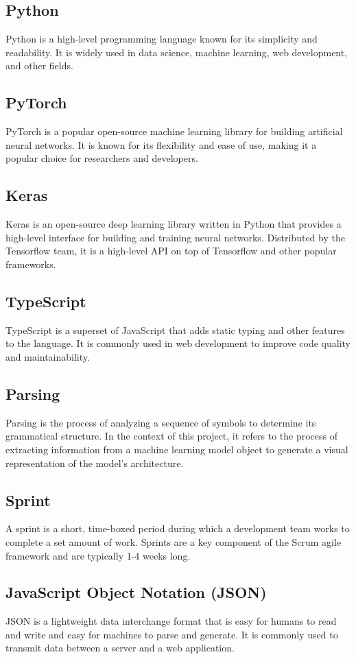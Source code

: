 \subsection*{Python}
Python is a high-level programming language known for its simplicity and readability. It is widely used in data science, machine learning, web development, and other fields.

\subsection*{PyTorch}
PyTorch is a popular open-source machine learning library for building artificial neural networks. It is known for its flexibility and ease of use, making it a popular choice for researchers and developers.

\subsection*{Keras}
Keras is an open-source deep learning library written in Python that provides a high-level interface for building and training neural networks. Distributed by the Tensorflow team, it is a high-level API on top of Tensorflow and other popular frameworks.

\subsection*{TypeScript}
TypeScript is a superset of JavaScript that adds static typing and other features to the language. It is commonly used in web development to improve code quality and maintainability.

\subsection*{Parsing}
Parsing is the process of analyzing a sequence of symbols to determine its grammatical structure. In the context of this project, it refers to the process of extracting information from a machine learning model object to generate a visual representation of the model's architecture.

\subsection*{Sprint}
A sprint is a short, time-boxed period during which a development team works to complete a set amount of work. Sprints are a key component of the Scrum agile framework and are typically 1-4 weeks long.

\subsection*{JavaScript Object Notation (JSON)}
JSON is a lightweight data interchange format that is easy for humans to read and write and easy for machines to parse and generate. It is commonly used to transmit data between a server and a web application.
